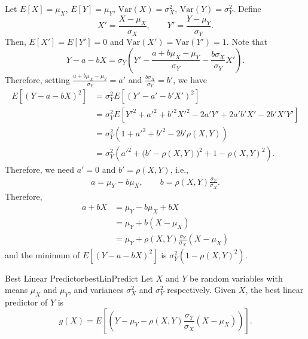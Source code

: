 \documentclass[math]{amznotes}
\theoremstyle{remark}
\begin{document}
Let $E[X] = \mu_X$, $E[Y] = \mu_Y$, $\mathrm{Var}(X) = \sigma_X^2$, $\mathrm{Var}(Y) = \sigma_Y^2$. Define
\begin{equation*}
    X' = \frac{X - \mu_X}{\sigma_X}, \qquad Y' = \frac{Y - \mu_Y}{\sigma_Y}.
\end{equation*}
Then, $E\left[X'\right] = E\left[Y'\right] = 0$ and $\mathrm{Var}(X') = \mathrm{Var}(Y') = 1$. Note that
\begin{equation*}
    Y - a - bX = \sigma_Y\left(Y' - \frac{a + b\mu_X - \mu_Y}{\sigma_Y} - \frac{b\sigma_X}{\sigma_Y}X'\right).    
\end{equation*}
Therefore, setting $\frac{a + b\mu_X - \mu_Y}{\sigma_Y} = a'$ and $\frac{b\sigma_X}{\sigma_Y} = b'$, we have 
\begin{align*}
    E\left[(Y - a - bX)^2\right] & = \sigma_Y^2E\left[\left(Y' - a' - b'X'\right)^2\right] \\
    & = \sigma_Y^2E\left[Y'^2 + a'^2 + b'^2X'^2 - 2a'Y' + 2a'b'X' - 2b'X'Y'\right] \\
    & = \sigma_Y^2\left(1 + a'^2 + b'^2 - 2b'\rho(X, Y)\right) \\
    & = \sigma_Y^2\left(a'^2 + \bigl(b' - \rho(X, Y)\bigr)^2 + 1 - \rho(X, Y)^2\right).
\end{align*}
Therefore, we need $a' = 0$ and $b' = \rho(X, Y)$, i.e.,
\begin{align*}
    a = \mu_Y - b\mu_X, \qquad b = \rho(X, Y)\frac{\sigma_Y}{\sigma_X}.
\end{align*}
Therefore, 
\begin{align*}
    a + bX & = \mu_Y - b\mu_X + bX \\
    & = \mu_Y + b(X - \mu_X) \\
    & = \mu_Y + \rho(X, Y)\frac{\sigma_Y}{\sigma_X}(X - \mu_X)
\end{align*}
and the minimum of $E\left[(Y - a - bX)^2\right]$ is $\sigma_Y^2\left(1 - \rho(X, Y)^2\right)$.
\begin{thmbox}{Best Linear Predictor}{bestLinPredict}
    Let $X$ and $Y$ be random variables with means $\mu_X$ and $\mu_Y$, and variances $\sigma_X^2$ and $\sigma_Y^2$ respectively. Given $X$, the best linear predictor of $Y$ is
    \begin{equation*}
        g(X) = E\left[\left(Y - \mu_Y - \rho(X, Y)\frac{\sigma_Y}{\sigma_X}(X - \mu_X)\right)\right].
    \end{equation*}
\end{thmbox}
\end{document}
